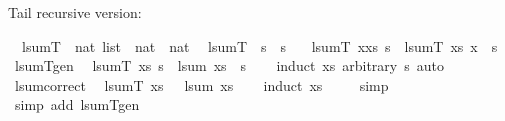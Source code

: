 \begin{isabellebody}
%
\endisatagproof
{\isafoldproof}%
%
\isadelimproof
%
\endisadelimproof
%
\begin{isamarkuptext}%
Tail recursive version:%
\end{isamarkuptext}\isamarkuptrue%
\isamarkupfalse%
\isanewline
\ \ lsumT\ {\isacharcolon}{\kern0pt}{\isacharcolon}{\kern0pt}\ {\isachardoublequoteopen}nat\ list\ {\isasymRightarrow}\ nat\ {\isasymRightarrow}\ nat{\isachardoublequoteclose}\isanewline
{}\isanewline
\ \ {\isachardoublequoteopen}lsumT\ {\isacharbrackleft}{\kern0pt}{\isacharbrackright}{\kern0pt}\ s\ {\isacharequal}{\kern0pt}\ s{\isachardoublequoteclose}\ {\isacharbar}{\kern0pt}\isanewline
\ \ {\isachardoublequoteopen}lsumT\ {\isacharparenleft}{\kern0pt}x{\isacharhash}{\kern0pt}xs{\isacharparenright}{\kern0pt}\ s\ {\isacharequal}{\kern0pt}\ lsumT\ xs\ {\isacharparenleft}{\kern0pt}x\ {\isacharplus}{\kern0pt}\ s{\isacharparenright}{\kern0pt}{\isachardoublequoteclose}\isanewline
\isanewline
{}\isamarkupfalse%
\ lsumT{\isacharunderscore}{\kern0pt}gen{\isacharcolon}{\kern0pt}\isanewline
\ \ {\isachardoublequoteopen}lsumT\ xs\ s\ {\isacharequal}{\kern0pt}\ lsum\ xs\ {\isacharplus}{\kern0pt}\ s{\isachardoublequoteclose}\isanewline
%
\isadelimproof
\ \ %
\endisadelimproof
%
\isatagproof
{}\isamarkupfalse%
\ {\isacharparenleft}{\kern0pt}induct\ xs\ arbitrary{\isacharcolon}{\kern0pt}\ s{\isacharcomma}{\kern0pt}\ auto{\isacharparenright}{\kern0pt}%
\endisatagproof
{\isafoldproof}%
%
\isadelimproof
\isanewline
%
\endisadelimproof
\isanewline
{}\isamarkupfalse%
\ lsum{\isacharunderscore}{\kern0pt}correct{\isacharcolon}{\kern0pt}\isanewline
\ \ {\isachardoublequoteopen}lsumT\ xs\ {}\ {\isacharequal}{\kern0pt}\ lsum\ xs{\isachardoublequoteclose}\isanewline
%
\isadelimproof
\ \ %
\endisadelimproof
%
\isatagproof
{}\isamarkupfalse%
\ {\isacharparenleft}{\kern0pt}induct\ xs{\isacharparenright}{\kern0pt}\isanewline
\ \ \ \isamarkupfalse%
\ {\isacharparenleft}{\kern0pt}simp{\isacharparenright}{\kern0pt}\isanewline
\ \ \isamarkupfalse%
\ {\isacharparenleft}{\kern0pt}simp\ add\ {\isacharcolon}{\kern0pt}lsumT{\isacharunderscore}{\kern0pt}gen{\isacharparenright}{\kern0pt}\isanewline
\ \ \isamarkupfalse%
%
\endisatagproof
{\isafoldproof}%
%
\isadelimproof
\isanewline
%
\endisadelimproof
%
\isadelimtheory
\isanewline
%
\endisadelimtheory
%
\isatagtheory
{}\isamarkupfalse%
%
\endisatagtheory
{\isafoldtheory}%
%
\isadelimtheory
%
\endisadelimtheory
%
\end{isabellebody}%

